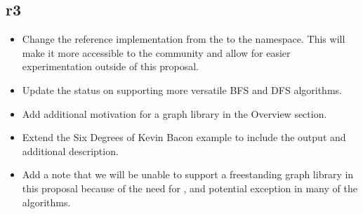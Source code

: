 \subsection*{\paperno r3}
\begin{itemize}
      \item Change the reference implementation from the  to the  namespace. This will
            make it more accessible to the community and allow for easier experimentation outside of this proposal.
      \item Update the status on supporting more versatile BFS and DFS algorithms.
      \item Add additional motivation for a graph library in the Overview section.
      \item Extend the Six Degrees of Kevin Bacon example to include the output and additional description.
      \item Add a note that we will be unable to support a freestanding graph library in this proposal because
            of the need for ,  and potential  exception in many of 
            the algorithms.
\end{itemize}
